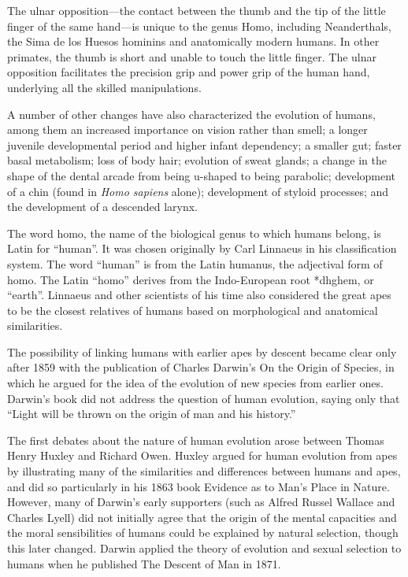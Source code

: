 The ulnar opposition---the contact between the thumb and the tip of the little finger of the same hand---is unique to the genus Homo, including Neanderthals, the Sima de los Huesos hominins and anatomically modern humans. In other primates, the thumb is short and unable to touch the little finger. The ulnar opposition facilitates the precision grip and power grip of the human hand, underlying all the skilled manipulations.

A number of other changes have also characterized the evolution of humans, among them an increased importance on vision rather than smell; a longer juvenile developmental period and higher infant dependency; a smaller gut; faster basal metabolism; loss of body hair; evolution of sweat glands; a change in the shape of the dental arcade from being u-shaped to being parabolic; development of a chin (found in \emph{Homo sapiens} alone); development of styloid processes; and the development of a descended larynx.

The word homo, the name of the biological genus to which humans belong, is Latin for ``human''. It was chosen originally by Carl Linnaeus in his classification system. The word ``human'' is from the Latin humanus, the adjectival form of homo. The Latin ``homo'' derives from the Indo-European root *dhghem, or ``earth''. Linnaeus and other scientists of his time also considered the great apes to be the closest relatives of humans based on morphological and anatomical similarities.

The possibility of linking humans with earlier apes by descent became clear only after 1859 with the publication of Charles Darwin's On the Origin of Species, in which he argued for the idea of the evolution of new species from earlier ones. Darwin's book did not address the question of human evolution, saying only that ``Light will be thrown on the origin of man and his history.''

The first debates about the nature of human evolution arose between Thomas Henry Huxley and Richard Owen. Huxley argued for human evolution from apes by illustrating many of the similarities and differences between humans and apes, and did so particularly in his 1863 book Evidence as to Man's Place in Nature. However, many of Darwin's early supporters (such as Alfred Russel Wallace and Charles Lyell) did not initially agree that the origin of the mental capacities and the moral sensibilities of humans could be explained by natural selection, though this later changed. Darwin applied the theory of evolution and sexual selection to humans when he published The Descent of Man in 1871.

